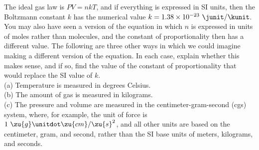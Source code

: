 The ideal gas law is $PV=nkT$, and if everything is expressed in SI units, then
the Boltzmann constant $k$ has the numerical value $k=1.38\times10^{-23}\ \junit/\kunit$. You may also have seen a version of the equation in which
$n$ is expressed in units of moles rather than molecules, and the constant of
proportionality then has a different value. The following are three other
ways in which we could imagine making a different version of the equation. In
each case, explain whether this makes sense, and if so, find the value of
the constant of proportionality that would replace the SI value of $k$.\\
(a) Temperature is measured in degrees Celsius.\\
(b) The amount of gas is measured in kilograms.\\
(c) The pressure and volume are measured in the centimeter-gram-second
(cgs) system, where, for example, the unit of force is $1\ \zu{g}\unitdot\zu{cm}/\zu{s}^2$,
and all other units are based on the centimeter, gram, and second, rather than
the SI base units of meters, kilograms, and seconds.


